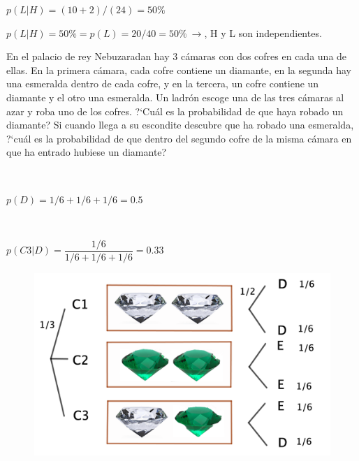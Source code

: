 $p(L|H)=(10+2)/(24)=50\%$

$p(L|H)=50\% = p(L)=20/40=50\% \ \to $, H y L son independientes.
\vspace{5mm}
\begin{ejemplo}
\begin{ejer}
En el palacio de rey Nebuzaradan hay 3 cámaras con dos cofres en cada una de ellas. En la primera cámara, cada cofre contiene un diamante, en la segunda hay una esmeralda dentro de cada cofre, y en la tercera, un cofre contiene un diamante y el otro una esmeralda. Un ladrón escoge una de las tres cámaras al azar y roba uno de los cofres. ?`Cuál es la probabilidad de que haya robado un diamante? Si cuando llega a su escondite descubre que ha robado una esmeralda, ?`cuál es la probabilidad de que dentro del segundo cofre de la misma cámara en que ha entrado hubiese un diamante?	
\end{ejer}
\end{ejemplo}
\begin{multicols}{2}
$\quad$

$p(D)=1/6+1/6+1/6=0.5$

$\quad$

$p(C3|D)=\dfrac{1/6}{1/6+1/6+1/6}=0.33$
	\begin{figure}[H]
				\centering
			\includegraphics[width=.4\textwidth]{imagenes/imagenes02/T02IM33.png}
	\end{figure}	
\end{multicols}	


